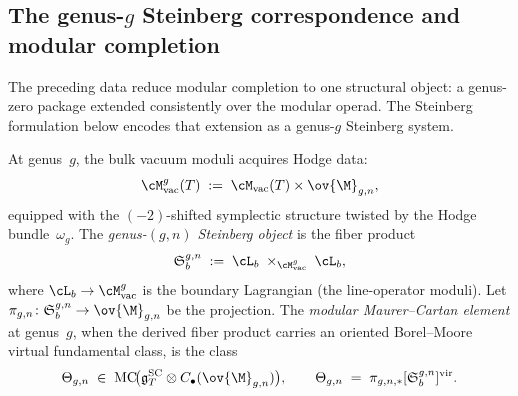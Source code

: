 \subsection{The genus-$g$ Steinberg correspondence and modular completion}
\label{subsec:genus-g-steinberg-modular}

\providecommand{\fS}{\mathfrak{S}}

The preceding data reduce modular completion to one structural object:
a genus-zero package extended consistently over the modular operad. The
Steinberg formulation below encodes that extension as a genus-\(g\)
Steinberg system.

\begin{construction}
\label{con:genus-g-steinberg}
At genus~$g$, the bulk vacuum moduli acquires Hodge data:
\begin{equation}
\label{eq:moduli-genus-g}
\cM_{\mathrm{vac}}^{g}(T)
\;:=\;
\cM_{\mathrm{vac}}(T) \times \ov{\M}_{g,n},
\end{equation}
equipped with the $(-2)$-shifted symplectic structure twisted by the
Hodge bundle~$\omega_g$. The \emph{genus-$(g,n)$ Steinberg object} is the
fiber product
\begin{equation}
\label{eq:genus-g-steinberg}
\fS_b^{g,n}
\;:=\;
\cL_b \;\times_{\cM_{\mathrm{vac}}^{g}}\; \cL_b,
\end{equation}
where $\cL_b \to \cM_{\mathrm{vac}}^{g}$ is the boundary Lagrangian
(the line-operator moduli). Let
$\pi_{g,n}\colon\fS_b^{g,n}\to\ov{\M}_{g,n}$ be the projection.
The \emph{modular Maurer--Cartan element}
at genus~$g$, when the derived fiber product carries an oriented
Borel--Moore virtual fundamental class, is the class
\begin{equation}
\label{eq:modular-mc-steinberg}
\Theta_{g,n}
\;\in\;
\mathrm{MC}\!\bigl(\mathfrak{g}^{\mathrm{SC}}_T
\otimes C_\bullet(\ov{\M}_{g,n})\bigr),
\qquad
\Theta_{g,n} \;=\; \pi_{g,n,*}[\fS_b^{g,n}]^{\mathrm{vir}}.
\end{equation}
\end{construction}

